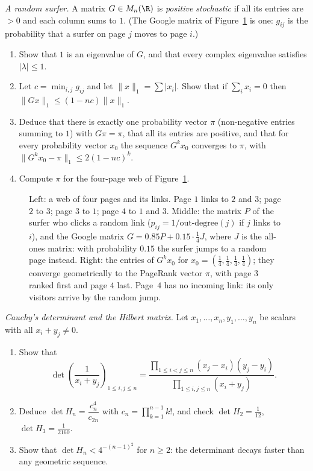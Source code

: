 \begin{exercise}[$\star\star\star$]\label{ex:stochastic}
\emph{A random surfer.} A matrix $G\in M_n(\R)$ is \emph{positive stochastic} if all its entries are $>0$ and each column sums to $1$. (The Google matrix of Figure~\ref{fig:pagerank} is one: $g_{ij}$ is the probability that a surfer on page $j$ moves to page $i$.)
\begin{enumerate}[label=(\alph*)]
\item Show that $1$ is an eigenvalue of $G$, and that every complex eigenvalue satisfies $|\lambda|\le1$.
\item Let $c=\min_{i,j}g_{ij}$ and let $\|x\|_1=\sum|x_i|$. Show that if $\sum_ix_i=0$ then $\|Gx\|_1\le(1-nc)\|x\|_1$.
\item Deduce that there is exactly one probability vector $\pi$ (non-negative entries summing to $1$) with $G\pi=\pi$, that all its entries are positive, and that for every probability vector $x_0$ the sequence $G^kx_0$ converges to $\pi$, with $\|G^kx_0-\pi\|_1\le2(1-nc)^k$.
\item Compute $\pi$ for the four-page web of Figure~\ref{fig:pagerank}.
\end{enumerate}
\end{exercise}

\begin{figure}[ht]
\centering
{}
\caption{Left: a web of four pages and its links. Page $1$ links to $2$ and $3$; page $2$ to $3$; page $3$ to $1$; page $4$ to $1$ and $3$. Middle: the matrix $P$ of the surfer who clicks a random link ($p_{ij}=1/\text{out-degree}(j)$ if $j$ links to $i$), and the Google matrix $G=0.85P+0.15\cdot\frac14J$, where $J$ is the all-ones matrix: with probability $0.15$ the surfer jumps to a random page instead. Right: the entries of $G^kx_0$ for $x_0=(\frac14,\frac14,\frac14,\frac14)$; they converge geometrically to the PageRank vector $\pi$, with page $3$ ranked first and page $4$ last. Page~$4$ has no incoming link: its only visitors arrive by the random jump.}
\label{fig:pagerank}
\end{figure}

\begin{exercise}[$\star\star\star$]\label{ex:cauchydet}
\emph{Cauchy's determinant and the Hilbert matrix.} Let $x_1,\dots,x_n,y_1,\dots,y_n$ be scalars with all $x_i+y_j\ne0$.
\begin{enumerate}[label=(\alph*)]
\item Show that
\[
\det\left(\frac1{x_i+y_j}\right)_{1\le i,j\le n}=\frac{\prod_{1\le i<j\le n}(x_j-x_i)(y_j-y_i)}{\prod_{1\le i,j\le n}(x_i+y_j)}.
\]
\item Deduce $\det H_n=\dfrac{c_n^4}{c_{2n}}$ with $c_n=\prod_{k=1}^{n-1}k!$, and check $\det H_2=\frac1{12}$, $\det H_3=\frac1{2160}$.
\item Show that $\det H_n<4^{-(n-1)^2}$ for $n\ge2$: the determinant decays faster than any geometric sequence.
\end{enumerate}
\end{exercise}

